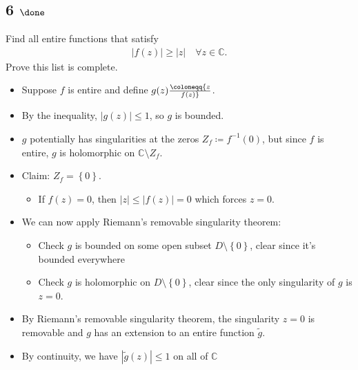 \hypertarget{done-5}{%
\subsection{\texorpdfstring{6
\(\done\)}{6 \textbackslash done}}\label{done-5}}

Find all entire functions that satisfy
\begin{align*}
{\left\lvert {f(z)} \right\rvert} \geq {\left\lvert {z} \right\rvert} \quad \forall z\in {\mathbb{C}}
.\end{align*}
Prove this list is complete.

\begin{solution}

\hfill

\begin{concept}

\hfill

\end{concept}

\begin{itemize}
\tightlist
\item
  Suppose \(f\) is entire and define \(g(z) \coloneqq{z \over f(z)}\).
\item
  By the inequality, \({\left\lvert {g(z)} \right\rvert} \leq 1\), so
  \(g\) is bounded.
\item
  \(g\) potentially has singularities at the zeros
  \(Z_f \coloneqq f^{-1}(0)\), but since \(f\) is entire, \(g\) is
  holomorphic on \({\mathbb{C}}\setminus Z_f\).
\item
  Claim: \(Z_f = \left\{{0}\right\}\).

  \begin{itemize}
  \tightlist
  \item
    If \(f(z) = 0\), then
    \({\left\lvert {z} \right\rvert} \leq {\left\lvert {f(z)} \right\rvert} = 0\)
    which forces \(z=0\).
  \end{itemize}
\item
  We can now apply Riemann's removable singularity theorem:

  \begin{itemize}
  \tightlist
  \item
    Check \(g\) is bounded on some open subset
    \(D\setminus\left\{{0}\right\}\), clear since it's bounded
    everywhere
  \item
    Check \(g\) is holomorphic on \(D\setminus\left\{{0}\right\}\),
    clear since the only singularity of \(g\) is \(z=0\).
  \end{itemize}
\item
  By Riemann's removable singularity theorem, the singularity \(z = 0\)
  is removable and \(g\) has an extension to an entire function
  \(\tilde g\).
\item
  By continuity, we have
  \({\left\lvert {\tilde g(z)} \right\rvert} \leq 1\) on all of
  \({\mathbb{C}}\)


\end{itemize}
\end{solution}
